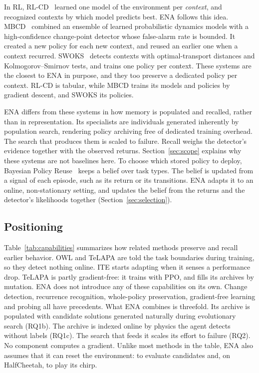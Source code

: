 In RL, RL-CD~\citep{dasilva2006dealing} learned one model of the environment per \textit{context}, and recognized contexts by which model predicts best. ENA follows this idea. MBCD~\citep{alegre2021minimum} combined an ensemble of learned probabilistic dynamics models with a high-confidence change-point detector whose false-alarm rate is bounded. It created a new policy for each new context, and reused an earlier one when a context recurred. SWOKS~\citep{dick2024statistical} detects contexts with optimal-transport distances and Kolmogorov--Smirnov tests, and trains one policy per context. These systems are the closest to ENA in purpose, and they too preserve a dedicated policy per context. RL-CD is tabular, while MBCD trains its models and policies by gradient descent, and SWOKS its policies.

ENA differs from these systems in how memory is populated and recalled, rather than in representation. Its specialists are individuals generated inherently by population search, rendering policy archiving free of dedicated training overhead. The search that produces them is scaled to failure. Recall weighs the detector's evidence together with the observed returns. Section~\ref{sec:scope} explains why these systems are not baselines here. To choose which stored policy to deploy, Bayesian Policy Reuse~\citep{rosman2016bayesian} keeps a belief over task types. The belief is updated from a signal of each episode, such as its return or its transitions. ENA adapts it to an online, non-stationary setting, and updates the belief from the returns and the detector's likelihoods together (Section~\ref{sec:selection}).

\subsection{Positioning}
Table~\ref{tab:capabilities} summarizes how related methods preserve and recall earlier behavior. OWL and TeLAPA are told the task boundaries during training, so they detect nothing online. ITE starts adapting when it senses a performance drop. TeLAPA is partly gradient-free: it trains with PPO, and fills its archives by mutation. ENA does not introduce any of these capabilities on its own. Change detection, recurrence recognition, whole-policy preservation, gradient-free learning and probing all have precedents. What ENA combines is threefold. Its archive is populated with candidate solutions generated naturally during evolutionary search (RQ1b). The archive is indexed online by physics the agent detects without labels (RQ1c). The search that feeds it scales its effort to failure (RQ2). No component computes a gradient. Unlike most methods in the table, ENA also assumes that it can reset the environment: to evaluate candidates and, on HalfCheetah, to play its chirp.

